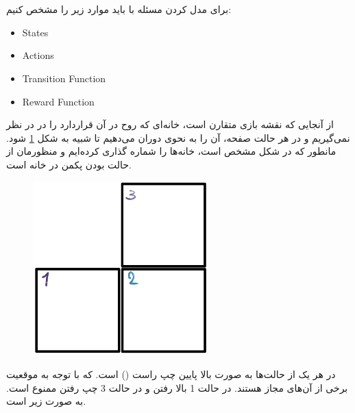 \documentclass{university}
\begin{document}
\setupdocument

\section{}

برای مدل کردن مسئله با 
باید موارد زیر را مشخص کنیم:

\begin{latin}
\begin{itemize}
    \item States
    \item Actions
    \item Transition Function
    \item Reward Function
\end{itemize}
\end{latin}

از آنجایی که نقشه بازی متقارن است، خانه‌ای که روح در آن قراردارد را در 
در نظر نمی‌گیریم و در هر حالت صفحه، آن را به نحوی دوران می‌دهیم تا شبیه به شکل 
\ref{fig:states} 
شود. مانطور که در شکل مشخص است، خانه‌ها را شماره گذاری کرده‌ایم و منظورمان از حالت 
بودن پکمن در خانه 
است. 

\begin{figure}[htbp]
    \centering
    \includegraphics[width=0.6\textwidth]{assets/states.png}
    \caption{}
    \label{fig:states}
\end{figure}

در هر یک از حالت‌ها 
به صورت بالا پایین چپ راست 
()
است. که با توجه به موقعیت برخی از آن‌های مجاز هستند. در حالت 1 بالا رفتن و در حالت 3 چپ رفتن ممنوع است.
به صورت زیر است. 
\end{document}
